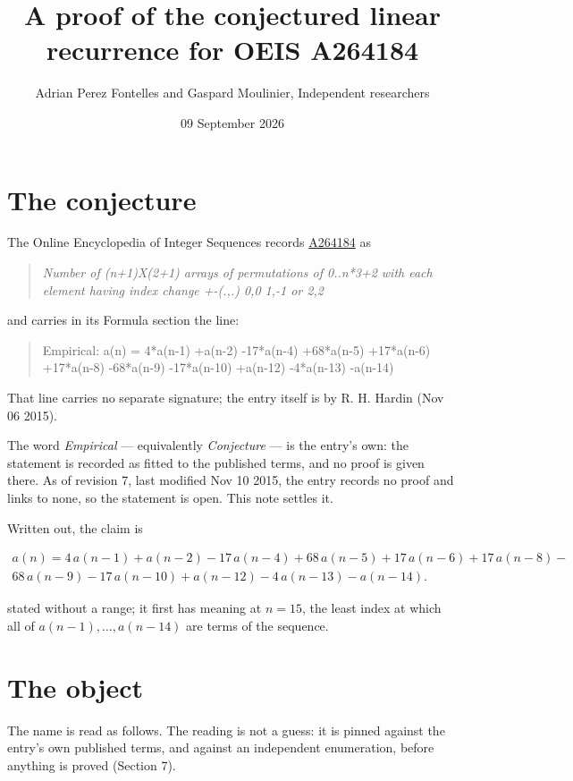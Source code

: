 \documentclass[11pt]{article}
\title{A proof of the conjectured linear recurrence for OEIS A264184}
\author{Adrian Perez Fontelles and Gaspard Moulinier, Independent researchers}
\date{09 September 2026}
\theoremstyle{definition}
\begin{document}
\maketitle
\section{The conjecture}

The Online Encyclopedia of Integer Sequences records \href{https://oeis.org/A264184}{A264184} as

\begin{quote}\itshape Number of (n+1)X(2+1) arrays of permutations of 0..n*3+2 with each element having index change +-(.,.) 0,0 1,-1 or 2,2\end{quote}

and carries in its Formula section the line:

\begin{quote}\ttfamily Empirical: a(n) = 4*a(n-1) +a(n-2) -17*a(n-4) +68*a(n-5) +17*a(n-6) +17*a(n-8) -68*a(n-9) -17*a(n-10) +a(n-12) -4*a(n-13) -a(n-14)\end{quote}

That line carries no separate signature; the entry itself is by R. H. Hardin (Nov 06 2015).

The word {\itshape Empirical} --- equivalently {\itshape Conjecture} --- is the entry's own: the statement is recorded as fitted to the published terms, and no proof is given there. As of revision 7, last modified Nov 10 2015, the entry records no proof and links to none, so the statement is open. This note settles it.

Written out, the claim is

\begin{multline*} a(n) = 4\,a(n-1) + a(n-2) - 17\,a(n-4) + 68\,a(n-5) + 17\,a(n-6) + 17\,a(n-8) - \\ 68\,a(n-9) - 17\,a(n-10) + a(n-12) - 4\,a(n-13) - a(n-14). \end{multline*}

stated without a range; it first has meaning at $n = 15$, the least index at which all of $a(n-1),\dots,a(n-14)$ are terms of the sequence.

\section{The object}

The name is read as follows. The reading is not a guess: it is pinned against the entry's own published terms, and against an independent enumeration, before anything is proved (Section 7).
\end{document}
